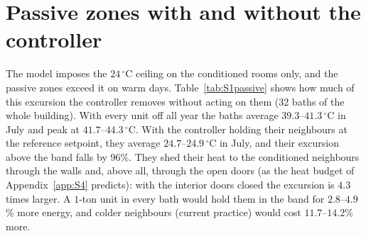 \documentclass[10pt,a4paper,twocolumn]{article}
\theoremstyle{definition}
\begin{document}
\section{Passive zones with and without the controller}\label{sec:S1passive}\label{app:S1}
The model imposes the $24\,^{\circ}$C ceiling on the conditioned rooms only, and the passive zones exceed it on warm days. Table~\ref{tab:S1passive} shows how much of this excursion the controller removes without acting on them (32 baths of the whole building). With every unit off all year the baths average $39.3$--$41.3\,^{\circ}\mathrm{C}$ in July and peak at $41.7$--$44.3\,^{\circ}\mathrm{C}$. With the controller holding their neighbours at the reference setpoint, they average $24.7$--$24.9\,^{\circ}\mathrm{C}$ in July, and their excursion above the band falls by $96$\%. They shed their heat to the conditioned neighbours through the walls and, above all, through the open doors (as the heat budget of Appendix~\ref{app:S4} predicts): with the interior doors closed the excursion is $4.3$ times larger. A $1$-ton unit in every bath would hold them in the band for $2.8$--$4.9$\% more energy, and colder neighbours (current practice) would cost $11.7$--$14.2$\% more.
\end{document}
